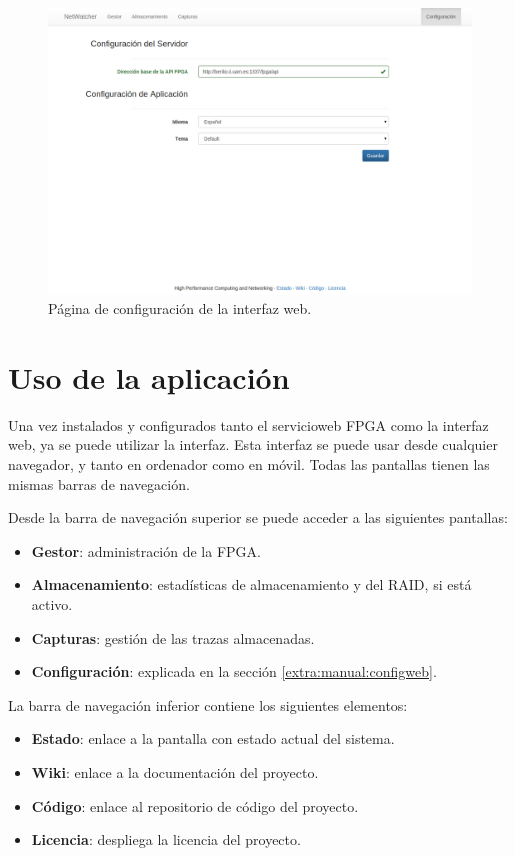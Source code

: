 \begin{figure}[!htp]
  \centering
  \includegraphics[width=\textwidth,clip=true]{graphics/capturas/configuracion_tema_base}
  \caption{Página de configuración de la interfaz web.}
  \label{fig:captura:configuracion}
\end{figure}


\section{Uso de la aplicación\label{extra:manual:uso}}
Una vez instalados y configurados tanto el \gls{servicioweb} \gls{FPGA} como la interfaz web, ya se puede utilizar la interfaz. Esta interfaz se puede usar desde cualquier navegador, y tanto en ordenador como en móvil. Todas las pantallas tienen las mismas barras de navegación.

Desde la barra de navegación superior se puede acceder a las siguientes pantallas:
\begin{itemize}
  \item \textbf{Gestor}: administración de la \gls{FPGA}.
  \item \textbf{Almacenamiento}: estadísticas de almacenamiento y del \gls{RAID}, si está activo.
  \item \textbf{Capturas}: gestión de las \glspl{traza} almacenadas.
  \item \textbf{Configuración}: explicada en la sección \ref{extra:manual:configweb}.
\end{itemize}

La barra de navegación inferior contiene los siguientes elementos:
\begin{itemize}
  \item \textbf{Estado}: enlace a la pantalla con estado actual del sistema.
  \item \textbf{Wiki}: enlace a la documentación del proyecto.
  \item \textbf{Código}: enlace al repositorio de código del proyecto.
  \item \textbf{Licencia}: despliega la licencia del proyecto.
\end{itemize}

